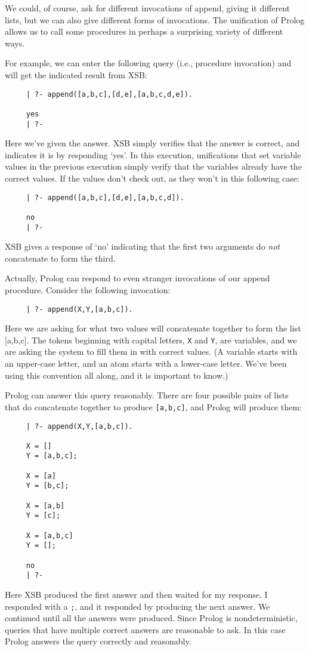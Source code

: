 We could, of course, ask for different invocations of append, giving
it different lists, but we can also give different forms of invocations.
The unification of Prolog allows us to call some procedures in perhaps
a surprising variety of different ways.

For example, we can enter the following query (i.e., procedure
invocation) and will get the indicated result from XSB:
\begin{verbatim}
     | ?- append([a,b,c],[d,e],[a,b,c,d,e]).

     yes
     | ?- 
\end{verbatim}
Here we've given the answer.  XSB simply verifies that the answer is
correct, and indicates it is by responding `yes'.  In this execution,
unifications that set variable values in the previous execution simply
verify that the variables already have the correct values.  If the
values don't check out, as they won't in this following case:
\begin{verbatim}
     | ?- append([a,b,c],[d,e],[a,b,c,d]).

     no
     | ?- 
\end{verbatim}
XSB gives a response of `no' indicating that the first two arguments
do {\em not} concatenate to form the third.

Actually, Prolog can respond to even stranger invocations of our
append procedure.  Consider the following invocation:
\begin{verbatim}
     | ?- append(X,Y,[a,b,c]).
\end{verbatim}
Here we are asking for what two values will concatenate together to
form the list [a,b,c].  The tokens beginning with capital letters,
\verb|X| and \verb|Y|, are variables, and we are asking the system to
fill them in with correct values.  (A variable starts with an
upper-case letter, and an atom starts with a lower-case letter.  We've
been using this convention all along, and it is important to know.)

Prolog can answer this query reasonably.  There are four possible
pairs of lists that do concatenate together to produce \verb|[a,b,c]|,
and Prolog will produce them:
\begin{verbatim}
     | ?- append(X,Y,[a,b,c]).

     X = []
     Y = [a,b,c];

     X = [a]
     Y = [b,c];

     X = [a,b]
     Y = [c];

     X = [a,b,c]
     Y = [];

     no
     | ?- 
\end{verbatim}
Here XSB produced the first answer and then waited for my response.  I
responded with a \verb|;|, and it responded by producing the next
answer.  We continued until all the answers were produced.  Since
Prolog is nondeterministic, queries that have multiple correct answers
are reasonable to ask.  In this case Prolog answers the query
correctly and reasonably.


